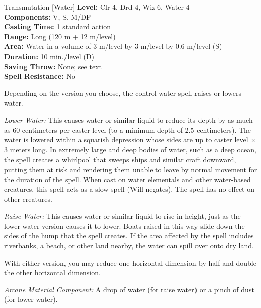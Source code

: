 {Transmutation [Water]}
{
	\textbf{Level:}
	Clr 4, Drd 4, Wiz 6, Water 4\\
	\textbf{Components:}
	V, S, M/DF\\
	\textbf{Casting Time:}
	1 standard action\\
	\textbf{Range:}
	Long (120 m + 12 m/level)\\
	\textbf{Area:}
	Water in a volume of 3 m/level by 3 m/level by 0.6 m/level (S)\\
	\textbf{Duration:}
	10 min./level (D)\\
	\textbf{Saving Throw:}
	None; see text\\
	\textbf{Spell Resistance:}
	No\\
}
{
	Depending on the version you choose, the control water spell raises or lowers water.

	\textit{Lower Water:}
	This causes water or similar liquid to reduce its depth by as much as 60 centimeters per caster level (to a minimum depth of 2.5 centimeters). The water is lowered within a squarish depression whose sides are up to caster level $\times$ 3 meters long. In extremely large and deep bodies of water, such as a deep ocean, the spell creates a whirlpool that sweeps ships and similar craft downward, putting them at risk and rendering them unable to leave by normal movement for the duration of the spell. When cast on water elementals and other water-based creatures, this spell acts as a slow spell (Will negates). The spell has no effect on other creatures.

	\textit{Raise Water:}
	This causes water or similar liquid to rise in height, just as the lower water version causes it to lower. Boats raised in this way slide down the sides of the hump that the spell creates. If the area affected by the spell includes riverbanks, a beach, or other land nearby, the water can spill over onto dry land.

	With either version, you may reduce one horizontal dimension by half and double the other horizontal dimension.

	\textit{Arcane Material Component:}
	A drop of water (for raise water) or a pinch of dust (for lower water).

}
